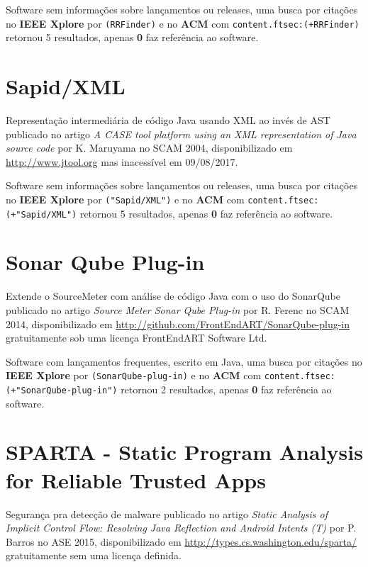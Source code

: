 Software sem informações sobre lançamentos ou releases,
uma busca por citações no {\bf IEEE Xplore} por
\texttt{(RRFinder)}
e no {\bf ACM} com
\texttt{content.ftsec:(+RRFinder)}
retornou
5 resultados, apenas
{\bf 0} faz referência ao software.



\section{Sapid/XML}

Representação intermediária de código Java usando XML ao invés de AST
publicado no artigo {\it A CASE tool platform using an XML representation of Java source code}
por K. Maruyama
no SCAM 2004,
disponibilizado em \url{http://www.jtool.org}
mas inacessível em 09/08/2017.

Software sem informações sobre lançamentos ou releases,
uma busca por citações no {\bf IEEE Xplore} por
\texttt{("Sapid/XML")}
e no {\bf ACM} com
\texttt{content.ftsec:(+"Sapid/XML")}
retornou
5 resultados, apenas
{\bf 0} faz referência ao software.



\section{Sonar Qube Plug-in}

Extende o SourceMeter com análise de código Java com o uso do SonarQube
publicado no artigo {\it Source Meter Sonar Qube Plug-in}
por R. Ferenc
no SCAM 2014,
disponibilizado em \url{http://github.com/FrontEndART/SonarQube-plug-in}
gratuitamente
sob uma licença FrontEndART Software Ltd.

Software com lançamentos frequentes,
escrito em Java,
uma busca por citações no {\bf IEEE Xplore} por
\texttt{(SonarQube-plug-in)}
e no {\bf ACM} com
\texttt{content.ftsec:(+"SonarQube-plug-in")}
retornou
2 resultados, apenas
{\bf 0} faz referência ao software.



\section{SPARTA - Static Program Analysis for Reliable Trusted Apps}

Segurança pra detecção de malware
publicado no artigo {\it Static Analysis of Implicit Control Flow: Resolving Java Reflection and Android Intents (T)}
por P. Barros
no ASE 2015,
disponibilizado em \url{http://types.cs.washington.edu/sparta/}
gratuitamente
sem uma licença definida.

